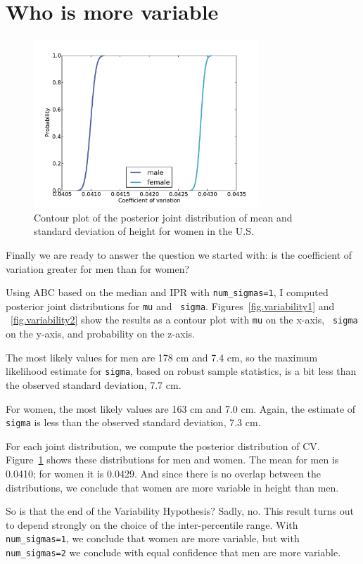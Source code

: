 \documentclass[12pt]{book}
\begin{document}
\section{Who is more variable}

\begin{figure}
\centerline{\includegraphics[height=2.5in]{figs/variability_cv.pdf}}
\caption{Contour plot of the posterior joint distribution of
mean and standard deviation of height for women in the U.S.}
\label{fig.variability3}
\end{figure}

Finally we are ready to answer the question we started with: is the
coefficient of variation greater for men than for women?

Using ABC based on the median and IPR with \verb"num_sigmas=1", I
computed posterior joint distributions for {\tt mu} and {\tt
  sigma}.  Figures~\ref{fig.variability1} and ~\ref{fig.variability2}
show the results as a contour plot with {\tt mu} on the x-axis, {\tt
  sigma} on the y-axis, and probability on the z-axis.

The most likely values for men are 178 cm and 7.4 cm, so the
maximum likelihood estimate for {\tt sigma}, based on robust
sample statistics, is a bit less than the observed
standard deviation, 7.7 cm.

For women, the most likely values are 163 cm and 7.0 cm.  Again,
the estimate of {\tt sigma} is less than the observed
standard deviation, 7.3 cm.

For each joint distribution, we compute the posterior distribution of
CV.  Figure~\ref{fig.variability3} shows these distributions for men
and women.  The mean for men is 0.0410; for women it is 0.0429.  And
since there is no overlap between the distributions, we conclude that
women are more variable in height than men.

So is that the end of the Variability Hypothesis?  Sadly, no.  This
result turns out to depend strongly on the choice of the
inter-percentile range.  With \verb"num_sigmas=1", we conclude that
women are more variable, but with \verb"num_sigmas=2" we conclude
with equal confidence that men are more variable.
\end{document}

